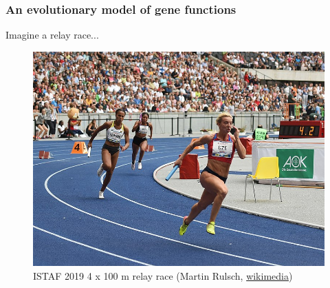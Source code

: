 \documentclass[aspectratio=169, 9pt, handout]{beamer}
\begin{document}
\begin{frame}[t]
\begin{minipage}[m]{.65\linewidth}
	\end{minipage}
\end{frame}

\begin{frame}
	\frametitle{An evolutionary model of gene functions}
	
	Imagine a relay race...
	\begin{figure}
		\includegraphics[width=.55\linewidth]{800px-2019-09-01_ISTAF_2019_4_x_100_m_relay_race_(Martin_Rulsch)_10.jpg}
		\caption{ISTAF 2019 4 x 100 m relay race (Martin Rulsch, \href{https://commons.wikimedia.org/wiki/File:2019-09-01_ISTAF_2019_4_x_100_m_relay_race_(Martin_Rulsch)_10.jpg}{wikimedia})}
	\end{figure}
	
\end{frame}
\end{document}
